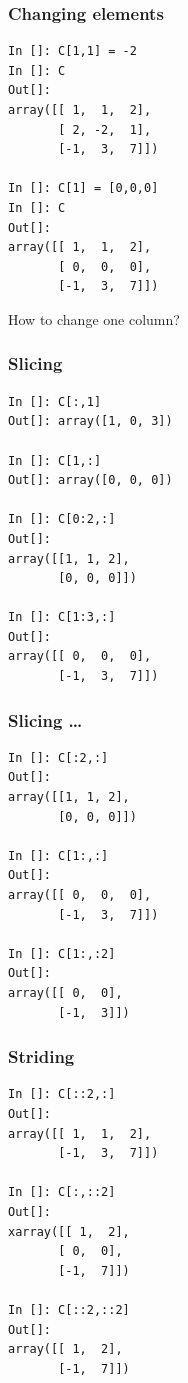 \documentclass[14pt,compress]{beamer}
\begin{document}
\begin{frame}[fragile]
  \frametitle{Changing elements}
  \begin{small}
  \begin{lstlisting}
In []: C[1,1] = -2
In []: C
Out[]: 
array([[ 1,  1,  2],
       [ 2, -2,  1],
       [-1,  3,  7]])

In []: C[1] = [0,0,0]
In []: C
Out[]: 
array([[ 1,  1,  2],
       [ 0,  0,  0],
       [-1,  3,  7]])
  \end{lstlisting}
  \end{small}
How to change one \alert{column}?
\end{frame}

\begin{frame}[fragile]
  \frametitle{Slicing}
\begin{small}
  \begin{lstlisting}
In []: C[:,1]
Out[]: array([1, 0, 3])

In []: C[1,:]
Out[]: array([0, 0, 0])

In []: C[0:2,:]
Out[]: 
array([[1, 1, 2],
       [0, 0, 0]])

In []: C[1:3,:]
Out[]: 
array([[ 0,  0,  0],
       [-1,  3,  7]])
  \end{lstlisting}
\end{small}
\end{frame}

\begin{frame}[fragile]
  \frametitle{Slicing \ldots}
\begin{small}
  \begin{lstlisting}
In []: C[:2,:]
Out[]: 
array([[1, 1, 2],
       [0, 0, 0]])

In []: C[1:,:]
Out[]: 
array([[ 0,  0,  0],
       [-1,  3,  7]])

In []: C[1:,:2]
Out[]: 
array([[ 0,  0],
       [-1,  3]])
  \end{lstlisting}

\end{small}
\end{frame}

\begin{frame}[fragile]
  \frametitle{Striding}
  \begin{small}
  \begin{lstlisting}
In []: C[::2,:]
Out[]: 
array([[ 1,  1,  2],
       [-1,  3,  7]])

In []: C[:,::2]
Out[]: 
xarray([[ 1,  2],
       [ 0,  0],
       [-1,  7]])

In []: C[::2,::2]
Out[]: 
array([[ 1,  2],
       [-1,  7]])
  \end{lstlisting}
  \end{small}
\end{frame}
\end{document}
